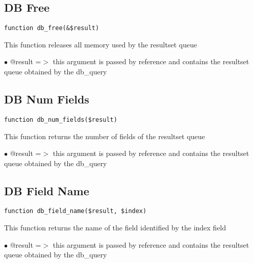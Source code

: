 \documentclass[a4paper]{book}
\begin{document}
\hypertarget{toc69}{}
\subsection{DB Free}

\begin{lstlisting}
function db_free(&$result)
\end{lstlisting}

This function releases all memory used by the resultset queue

\begin{compactitem}
\item[\color{myblue}$\bullet$] @result =$>$ this argument is passed by reference and contains the resultset queue
           obtained by the db\_query
\end{compactitem}

\hypertarget{toc70}{}
\subsection{DB Num Fields}

\begin{lstlisting}
function db_num_fields($result)
\end{lstlisting}

This function returns the number of fields of the resultset queue

\begin{compactitem}
\item[\color{myblue}$\bullet$] @result =$>$ this argument is passed by reference and contains the resultset queue
           obtained by the db\_query
\end{compactitem}

\hypertarget{toc71}{}
\subsection{DB Field Name}

\begin{lstlisting}
function db_field_name($result, $index)
\end{lstlisting}

This function returns the name of the field identified by the index field

\begin{compactitem}
\item[\color{myblue}$\bullet$] @result =$>$ this argument is passed by reference and contains the resultset queue
           obtained by the db\_query
\end{compactitem}
\end{document}
